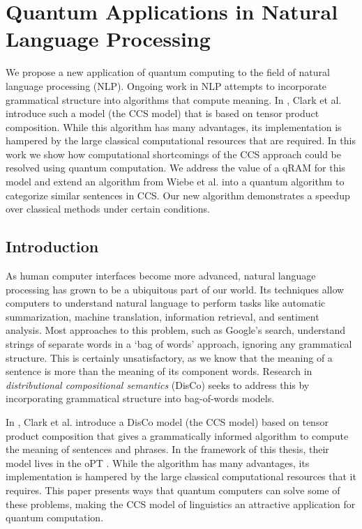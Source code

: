 \chapter{Quantum Applications in Natural Language Processing}
\label{chap:qDisCo}

\begin{chapabstract}
        We propose a new application of quantum computing to the field of natural language processing (NLP).  Ongoing work in NLP attempts to incorporate grammatical structure into algorithms that compute meaning.  In \cite{clark2008compositional}, Clark et al. introduce such a model (the CCS model) that is based on tensor product composition. While this algorithm has many advantages, its implementation is hampered by the large classical computational resources that are required. In this work we show how computational shortcomings of the  CCS approach could be resolved using quantum computation. We address the value of a qRAM \cite{giovannetti2008quantum} for this model and extend an algorithm from Wiebe et al. \cite{wiebe2014quantum} into a quantum algorithm to categorize similar sentences in CCS. Our new algorithm demonstrates a speedup over classical methods under certain conditions.
\end{chapabstract}

\section{Introduction}

As human computer interfaces become more advanced, natural language processing has grown to be a ubiquitous part of our world.  Its techniques allow computers to understand natural language to perform tasks like automatic summarization, machine translation, information retrieval, and sentiment analysis. Most approaches to this problem, such as Google's search, understand strings of separate words in a `bag of words' approach, ignoring any grammatical structure. This is certainly unsatisfactory, as we know that the meaning of a sentence is more than the meaning of its component words. Research in \textit{distributional compositional semantics} (DisCo) seeks to address this by incorporating grammatical structure into bag-of-words models. 

In \cite{clark2008compositional}, Clark et al. introduce a DisCo model (the CCS model) based on tensor product composition that gives a grammatically informed algorithm to compute the meaning of sentences and phrases. In the framework of this thesis, their model lives in the oPT . While the algorithm has many advantages, its implementation is hampered by the large classical computational resources that it requires.  This paper presents ways that quantum computers can solve some of these problems, making the CCS model of linguistics an attractive application for quantum computation.

